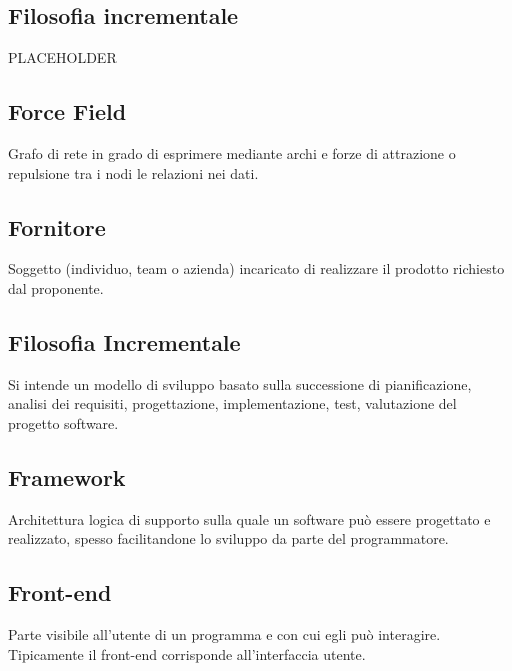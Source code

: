 \documentclass[../glossario.tex]{subfiles}
\begin{document}
\subsection*{Filosofia incrementale}
PLACEHOLDER

\subsection*{Force Field}
Grafo di rete in grado di esprimere mediante archi e forze di attrazione o repulsione tra i nodi le relazioni nei dati.

\subsection*{Fornitore}
Soggetto (individuo, team o azienda) incaricato di realizzare il prodotto richiesto dal proponente.


\subsection*{Filosofia Incrementale}
Si intende un modello di sviluppo basato sulla successione di pianificazione, analisi dei requisiti, progettazione, implementazione, test, valutazione del progetto software.


\subsection*{Framework}
Architettura logica di supporto sulla quale un software può essere progettato e realizzato, spesso facilitandone lo sviluppo da parte del programmatore.

\subsection*{Front-end}
Parte visibile all'utente di un programma e con cui egli può interagire. Tipicamente il front-end corrisponde all'interfaccia utente.

    
\end{document}
